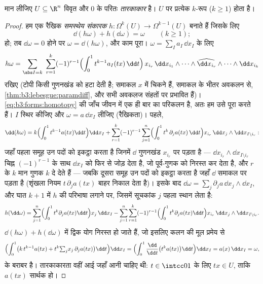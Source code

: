\begin{theorem}[पोंकारे प्रमेयिका]\label{thm:b3:forms:poincare}
मान लीजिए $U \subseteq \R^n$ विवृत और $0$ के परितः \emph{तारकाकार} है।
$U$ पर प्रत्येक  $k$-रूप ($k \geq 1$) 
होता है।
\end{theorem}

\begin{proof}
हम एक रैखिक \emph{समस्थेय संकारक} $h\colon
\Omega^k(U) \to \Omega^{k-1}(U)$ बनाते हैं जिसके लिए
\begin{equation}\label{eq:b3:forms:homotopy}
\dd(h\omega) + h(\dd\omega) = \omega
\qquad (k \geq 1);
\end{equation}
हो; तब $\dd\omega = 0$ होने पर $\omega = \dd(h\omega)$, और काम पूरा। $\omega = \sum_I a_I\,\dd x_I$ के लिए
\[
h\omega = \sum_{\abs I = k}\ \sum_{r=1}^{k}(-1)^{r-1}
\Bigl(\int_0^1 t^{k-1}a_I(tx)\,\dd t\Bigr)\,
x_{i_r}\,\dd x_{i_1}\wedge\dots\wedge
\widehat{\dd x_{i_r}}\wedge\dots\wedge\dd x_{i_k}
\]
रखिए (टोपी किसी गुणनखंड को हटा देती है; समाकल $x$ में चिकने हैं,
समाकल के भीतर अवकलन से, \cref{thm:b3:lebesgue:paramdiff}, और सभी अवकलज संहतों पर प्रभावित
हैं)। \eqref{eq:b3:forms:homotopy} की जाँच जीवन में एक ही बार का परिकलन है, अतः हम उसे
पूरा करते हैं। $I$ स्थिर कीजिए और $\omega =
a\,\dd x_I$ लीजिए (रैखिकता)। पहले,
\[
\dd(h\omega) = k\Bigl(\int_0^1t^{k-1}a(tx)\dd t\Bigr)\dd x_I
+ \sum_{r=1}^k(-1)^{r-1}\sum_{j=1}^n
\Bigl(\int_0^1t^{k}\,\partial_ja(tx)\,\dd t\Bigr)
x_{i_r}\,\dd x_j\wedge\dd x_{I\setminus i_r} :
\]
जहाँ पहला समूह उन पदों को इकट्ठा करता है जिनमें $\dd$ गुणनखंड
$x_{i_r}$ पर पड़ता है ---  $\dd x_{i_r}\wedge\dd
x_{I\setminus i_r}$ चिह्न $(-1)^{r-1}$ के साथ $\dd x_I$
को फिर से जोड़ देता है, जो पूर्व-गुणक को निरस्त कर देता है, और
$r$ के $k$ मान गुणक $k$ दे देते हैं --- जबकि दूसरा समूह उन
पदों को इकट्ठा करता है जहाँ $\dd$ समाकल पर पड़ता है (शृंखला नियम
$t\,\partial_ja(tx)$ बाहर निकाल देता है)। इसके बाद $\dd\omega =
\sum_j\partial_ja\,\dd x_j\wedge\dd x_I$, और घात $k+1$ में $h$
की परिभाषा लगाने पर, जिसमें सूचकांक $j$ पहला स्थान लेता है:
\[
h(\dd\omega) = \sum_{j=1}^n\Bigl(\int_0^1t^{k}
\partial_ja(tx)\dd t\Bigr)x_j\,\dd x_I
- \sum_{j=1}^n\sum_{r=1}^k(-1)^{r-1}
\Bigl(\int_0^1t^{k}\partial_ja(tx)\dd t\Bigr)
x_{i_r}\,\dd x_j\wedge\dd x_{I\setminus i_r} .
\]
$\dd(h\omega) + h(\dd\omega)$ में द्विक योग निरस्त हो जाते हैं, जो इसलिए कलन की मूल प्रमेय
से
\[
\Bigl(\int_0^1\bigl(k\,t^{k-1}a(tx) +
t^k{\textstyle\sum_j}x_j\,\partial_ja(tx)\bigr)\dd t\Bigr)
\dd x_I
= \Bigl(\int_0^1\frac{\dd}{\dd t}\bigl(t^ka(tx)\bigr)\dd
t\Bigr)\dd x_I
= a(x)\,\dd x_I = \omega,
\]
के बराबर है। तारकाकारता वहीं आई जहाँ आनी चाहिए थी: $t \in \intcc01$ के लिए
$tx \in U$, ताकि $a(tx)$ सार्थक हो।
\end{proof}

